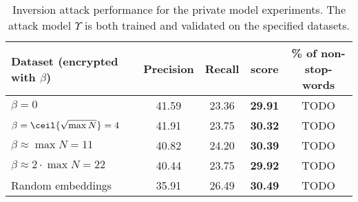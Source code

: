 {
	\def\arraystretch{1.2}
	\begin{table}[!ht]
		\begin{tabular*}{\linewidth}{ !{\extracolsep\fill} l c c >{\bfseries}c c } %
			\toprule
				Dataset (encrypted with $\beta$)												& Precision		& Recall	& \FOne{} score & \% of non-stop-words	\\
			\midrule
				$\beta = 0$							& 41.59			& 23.36		& 29.91			& TODO					\\
				$\beta = \ceil{\sqrt{\max N}} = 4$	& 41.91			& 23.75		& 30.32			& TODO					\\
				$\beta \approx \max N = 11$			& 40.82 		& 24.20 	& 30.39			& TODO					\\
				$\beta \approx 2 \cdot \max N = 22$	& 40.44 		& 23.75 	& 29.92			& TODO					\\
			\midrule
				Random embeddings					& 35.91			& 26.49		& 30.49			& TODO					\\
			\bottomrule
		\end{tabular*}
		\caption[Inversion attack performance for the private model experiments]{
			Inversion attack performance for the private model experiments.
			The attack model $\Upsilon$ is both trained and validated on the specified datasets.
		}%
		\label{table:knn-private}
	\end{table}
}
